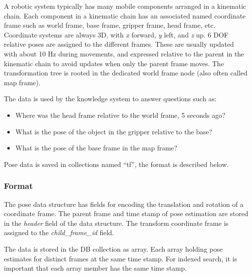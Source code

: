 
A robotic system typically has many mobile components arranged in a kinematic chain.
Each component in a kinematic chain has an associated named coordinate frame such as
world frame, base frame, gripper frame, head frame, etc.
Coordinate systems are always 3D, with \emph{x} forward, \emph{y} left, and \emph{z} up.
6 DOF relative poses are assigned to the different frames.
These are usually updated with about 10 Hz during movements, and
expressed relative to the 
parent in the kinematic chain to avoid updates when only the parent frame moves.
The transformation tree is rooted in the dedicated world frame node
(also often called map frame).

The data is used by the \ease knowledge system to answer questions such as:
\begin{itemize}
 \item Where was the head frame relative to the world frame, 5 seconds ago?
 \item What is the pose of the object in the gripper relative to the base?
 \item What is the pose of the base frame in the map frame? 
\end{itemize}


Pose data is saved in \mongodb collections named ``tf'', the format is described below.

\subsubsection{Format}
The pose data structure has
fields for encoding the translation and rotation of a coordinate frame.
The parent frame and time stamp of pose estimation
are stored in the \emph{header} field of the data structure.
The transform coordinate frame is assigned to the \emph{child\_frame\_id} field.

The data is stored in the DB collection as array.
Each array holding pose estimates for distinct frames
at the same time stamp.
For indexed search, it is important that each array
member has the same time stamp. \\

